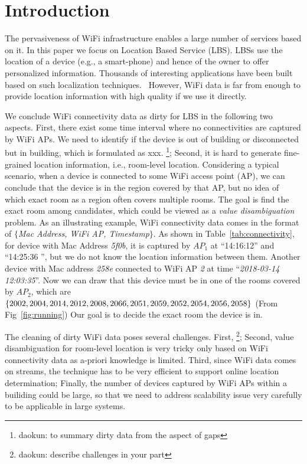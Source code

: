 \section{Introduction}
\label{sec:intro}

The pervasiveness of WiFi infrastructure enables a large number of services based on it. In this paper we focus on Location Based Service (LBS).
LBSs use the location of a device (e.g., a smart-phone)  and  hence  of  the  owner  to  offer  personalized  information. Thousands of interesting applications have been built based on such localization techniques.~\cite{akyildiz2002survey}
However, WiFi data is far from enough to provide location information with high quality if we use it directly. 

We conclude WiFi connectivity data as dirty for LBS in the following two aspects. First,  there exist some time interval where no connectivities are captured by WiFi APs. We need to identify if the device is out of building or disconnected but in building, which is formulated as xxx. \footnote{daokun: to summary dirty data from the aspect of gaps}; Second, it is hard to generate fine-grained location information, i.e., room-level location. Considering a typical scenario, when a device is connected to some WiFi access point (AP), we can conclude that the device is in the region covered by that AP, but no idea of which exact room as a region often covers multiple rooms. The goal is find the exact room among candidates, which could be viewed as a \textit{value disambiguation} problem. 
As an illustrating example, WiFi connectivity data comes in the format of $\{$\textit{Mac Address, WiFi AP, Timestamp}$\}$. As shown in Table~\ref{tab:connectivity}, for device with Mac Address \textit{5f0b}, it is captured by $AP_{1}$ at ``14:16:12'' and ``14:25:36 '', but we do not know the location information between them. Another device with Mac address \textit{258e} connected to WiFi AP \textit{2} at time ``\textit{2018-03-14 12:03:35}''. Now we can draw that this device must be in one of the rooms covered by $AP_2$, which are  $\{2002,2004,2014,2012,2008,2066,2051,\\2059,2052,2054,2056,2058\}$ (From Fig~\ref{fig:running}) Our goal is to decide the exact room the device is in. 

The cleaning of dirty WiFi data poses several challenges. First, \footnote{daokun: describe challenges in your part}; Second, value disambiguation for room-level location is very tricky only based on WiFi connectivity data as a-priori knowledge is limited. Third, since WiFi data comes on streams, the technique has to be very efficient to support online location determination; Finally, the number of devices captured by WiFi APs within a builiding could be large, so that we need to address scalability issue very carefully to be applicable in large systems. 

